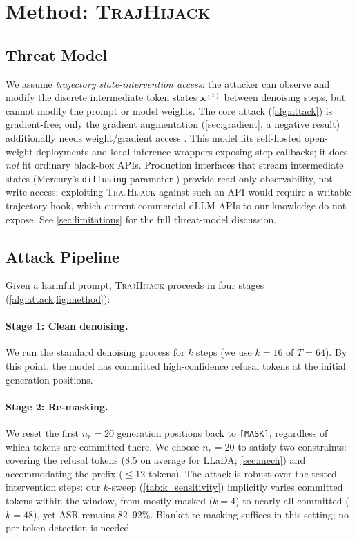 \documentclass{article}
\theoremstyle{coloredthm}
\newcommand{\method}{\textsc{TrajHijack}}
\newcommand{\dllm}{dLLM}
\newcommand{\maskid}{\texttt{[MASK]}}
\begin{document}
\section{Method: \method{}}
\label{sec:method}

\subsection{Threat Model}

We assume \emph{trajectory state-intervention access}: the attacker can observe and modify the discrete intermediate token states $\mathbf{x}^{(t)}$ between denoising steps, but cannot modify the prompt or model weights. The core attack (\cref{alg:attack}) is gradient-free; only the gradient augmentation (\cref{sec:gradient}, a negative result) additionally needs weight/gradient access \citep{zou2023gcg, carlini2023adversarial}. This model fits self-hosted open-weight deployments and local inference wrappers exposing step callbacks; it does \emph{not} fit ordinary black-box APIs. Production interfaces that stream intermediate states (Mercury's \texttt{diffusing} parameter \citep{mercury2026}) provide read-only observability, not write access; exploiting \method{} against such an API would require a writable trajectory hook, which current commercial \dllm{} APIs to our knowledge do not expose. See \cref{sec:limitations} for the full threat-model discussion.

\subsection{Attack Pipeline}

Given a harmful prompt, \method{} proceeds in four stages (\cref{alg:attack,fig:method}):

\paragraph{Stage 1: Clean denoising.} We run the standard denoising process for $k$ steps (we use $k{=}16$ of $T{=}64$). By this point, the model has committed high-confidence refusal tokens at the initial generation positions.

\paragraph{Stage 2: Re-masking.} We reset the first $n_r{=}20$ generation positions back to \maskid{}, regardless of which tokens are committed there. We choose $n_r{=}20$ to satisfy two constraints: covering the refusal tokens (8.5 on average for LLaDA; \cref{sec:mech}) and accommodating the prefix ($\leq$12 tokens). The attack is robust over the tested intervention steps: our $k$-sweep (\cref{tab:k_sensitivity}) implicitly varies committed tokens within the window, from mostly masked ($k{=}4$) to nearly all committed ($k{=}48$), yet ASR remains 82--92\%. Blanket re-masking suffices in this setting; no per-token detection is needed.
\end{document}
